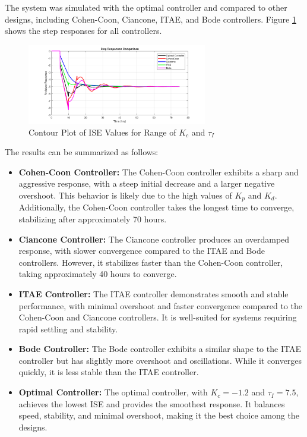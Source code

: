 \documentclass[12pt]{article}
\begin{document}
\begin{enumerate}
\begin{enumerate}
    The system was simulated with the optimal controller and compared to other designs, including Cohen-Coon, Ciancone, ITAE, and Bode controllers. Figure \ref{fig:figure2_4b} shows the step responses for all controllers.

    \begin{figure}[H]
      \centering
      \includegraphics[width=0.7\textwidth]{Figures/figure2-4b.png}
      \caption{Contour Plot of ISE Values for Range of \( K_c \) and \( \tau_I \)}
      \label{fig:figure2_4b}
    \end{figure}

    The results can be summarized as follows:
    \begin{itemize}
        \item \textbf{Cohen-Coon Controller:} The Cohen-Coon controller exhibits a sharp and aggressive response, with a steep initial decrease and a larger negative overshoot. This behavior is likely due to the high values of \( K_p \) and \( K_d \). Additionally, the Cohen-Coon controller takes the longest time to converge, stabilizing after approximately 70 hours.
        \item \textbf{Ciancone Controller:} The Ciancone controller produces an overdamped response, with slower convergence compared to the ITAE and Bode controllers. However, it stabilizes faster than the Cohen-Coon controller, taking approximately 40 hours to converge.
        \item \textbf{ITAE Controller:} The ITAE controller demonstrates smooth and stable performance, with minimal overshoot and faster convergence compared to the Cohen-Coon and Ciancone controllers. It is well-suited for systems requiring rapid settling and stability.
        \item \textbf{Bode Controller:} The Bode controller exhibits a similar shape to the ITAE controller but has slightly more overshoot and oscillations. While it converges quickly, it is less stable than the ITAE controller.
        \item \textbf{Optimal Controller:} The optimal controller, with \( K_c = -1.2 \) and \( \tau_I = 7.5 \), achieves the lowest ISE and provides the smoothest response. It balances speed, stability, and minimal overshoot, making it the best choice among the designs.
    \end{itemize}

    

  \end{enumerate}

\end{enumerate}
\end{document}
